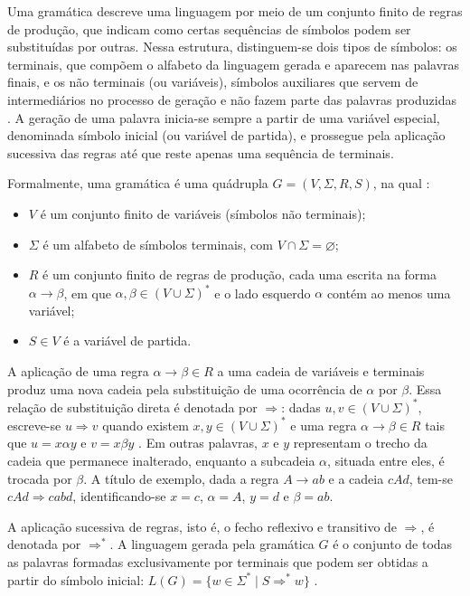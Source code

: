 \documentclass[
    12pt
    ,oneside
    ,a4paper
    ,chapter=TITLE
    ,section=TITLE
    ,sumario=abnt-6027-2012]{abntex2}
\begin{document}
Uma gramática descreve uma linguagem por meio de um conjunto finito de regras de
produção, que indicam como certas sequências de símbolos podem ser substituídas por outras.
Nessa estrutura, distinguem-se dois tipos de símbolos: os terminais, que compõem o
alfabeto da linguagem gerada e aparecem nas palavras finais, e os não terminais (ou
variáveis), símbolos auxiliares que servem de intermediários no processo de geração e
não fazem parte das palavras produzidas \cite{lewis1998,sipser2012}. A geração de uma palavra
inicia-se sempre a partir de uma variável especial, denominada símbolo inicial (ou
variável de partida), e prossegue pela aplicação sucessiva das regras até que reste apenas uma
sequência de terminais.

Formalmente, uma gramática é uma quádrupla $G = (V, \Sigma, R, S)$, na qual
\cite{sipser2012,diverio2011,vieira2004}:
\begin{itemize}
    \item $V$ é um conjunto finito de variáveis (símbolos não terminais);
    \item $\Sigma$ é um alfabeto de símbolos terminais, com $V \cap \Sigma = \varnothing$;
    \item $R$ é um conjunto finito de regras de produção, cada uma escrita na forma
          $\alpha \to \beta$, em que $\alpha, \beta \in (V \cup \Sigma)^*$ e o lado esquerdo
          $\alpha$ contém ao menos uma variável;
    \item $S \in V$ é a variável de partida.
\end{itemize}

A aplicação de uma regra $\alpha \to \beta \in R$ a uma cadeia de variáveis e terminais produz
uma nova cadeia pela substituição de uma ocorrência de $\alpha$ por $\beta$. Essa relação de
substituição direta é denotada por $\Rightarrow$: dadas $u, v \in (V \cup \Sigma)^*$, escreve-se
$u \Rightarrow v$ quando existem $x, y \in (V \cup \Sigma)^*$ e uma regra
$\alpha \to \beta \in R$ tais que $u = x\alpha y$ e $v = x\beta y$ \cite{lewis1998}. Em outras
palavras, $x$ e $y$ representam o trecho da cadeia que permanece inalterado, enquanto a
subcadeia $\alpha$, situada entre eles, é trocada por $\beta$. A título de exemplo, dada a regra
$A \to ab$ e a cadeia $cAd$, tem-se $cAd \Rightarrow cabd$, identificando-se $x = c$,
$\alpha = A$, $y = d$ e $\beta = ab$.

A aplicação sucessiva de regras, isto é, o fecho reflexivo e transitivo de $\Rightarrow$, é
denotada por $\Rightarrow^*$. A linguagem gerada pela gramática $G$ é o conjunto de
todas as palavras formadas exclusivamente por terminais que podem ser obtidas a partir do
símbolo inicial: $L(G) = \{ w \in \Sigma^* \mid S \Rightarrow^* w \}$
\cite{sipser2012,vieira2004}.
\end{document}
